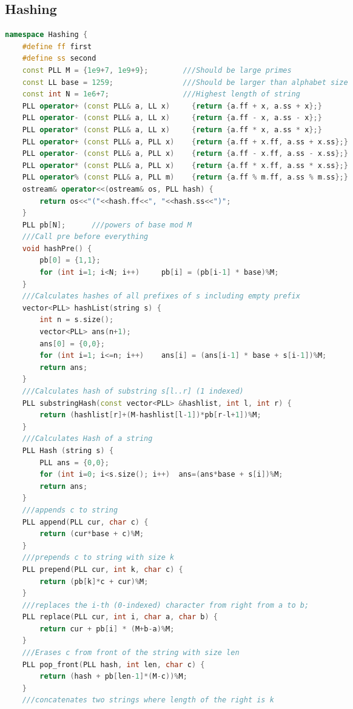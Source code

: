 \documentclass[10pt,a4paper,landscape]{article}
\begin{document}
\begin{multicols}{3}
\subsection{Hashing}
\begin{lstlisting}[language=C++, breaklines=true]
namespace Hashing {
    #define ff first
    #define ss second
    const PLL M = {1e9+7, 1e9+9};        ///Should be large primes
    const LL base = 1259;                ///Should be larger than alphabet size
    const int N = 1e6+7;                 ///Highest length of string
    PLL operator+ (const PLL& a, LL x)     {return {a.ff + x, a.ss + x};}
    PLL operator- (const PLL& a, LL x)     {return {a.ff - x, a.ss - x};}
    PLL operator* (const PLL& a, LL x)     {return {a.ff * x, a.ss * x};}
    PLL operator+ (const PLL& a, PLL x)    {return {a.ff + x.ff, a.ss + x.ss};}
    PLL operator- (const PLL& a, PLL x)    {return {a.ff - x.ff, a.ss - x.ss};}
    PLL operator* (const PLL& a, PLL x)    {return {a.ff * x.ff, a.ss * x.ss};}
    PLL operator% (const PLL& a, PLL m)    {return {a.ff % m.ff, a.ss % m.ss};}
    ostream& operator<<(ostream& os, PLL hash) {
        return os<<"("<<hash.ff<<", "<<hash.ss<<")";
    }
    PLL pb[N];      ///powers of base mod M
    ///Call pre before everything
    void hashPre() {
        pb[0] = {1,1};
        for (int i=1; i<N; i++)     pb[i] = (pb[i-1] * base)%M;
    }
    ///Calculates hashes of all prefixes of s including empty prefix
    vector<PLL> hashList(string s) {
        int n = s.size();
        vector<PLL> ans(n+1);
        ans[0] = {0,0};
        for (int i=1; i<=n; i++)    ans[i] = (ans[i-1] * base + s[i-1])%M;
        return ans;
    }
    ///Calculates hash of substring s[l..r] (1 indexed)
    PLL substringHash(const vector<PLL> &hashlist, int l, int r) {
        return (hashlist[r]+(M-hashlist[l-1])*pb[r-l+1])%M;
    }
    ///Calculates Hash of a string
    PLL Hash (string s) {
        PLL ans = {0,0};
        for (int i=0; i<s.size(); i++)  ans=(ans*base + s[i])%M;
        return ans;
    }
    ///appends c to string
    PLL append(PLL cur, char c) {
        return (cur*base + c)%M;
    }
    ///prepends c to string with size k
    PLL prepend(PLL cur, int k, char c) {
        return (pb[k]*c + cur)%M;
    }
    ///replaces the i-th (0-indexed) character from right from a to b;
    PLL replace(PLL cur, int i, char a, char b) {
        return cur + pb[i] * (M+b-a)%M;
    }
    ///Erases c from front of the string with size len
    PLL pop_front(PLL hash, int len, char c) {
        return (hash + pb[len-1]*(M-c))%M;
    }
    ///concatenates two strings where length of the right is k

\end{lstlisting}
\end{multicols}
\end{document}
